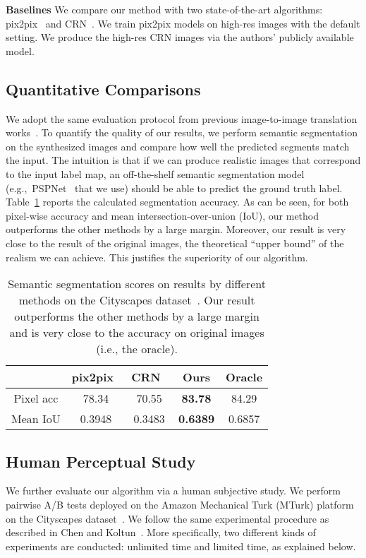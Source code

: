 \documentclass[10pt,twocolumn,letterpaper]{article}
\newcommand{\reftbl}[1]{Table~\ref{tbl:#1}}
\newcommand{\lblsec}[1]{\label{sec:#1}}
\newcommand{\lbltbl}[1]{\label{tbl:#1}}
\newcommand{\ck}{Chen and Koltun~\cite{chen2017photographic}\xspace}
\newcommand{\pp}{pix2pix\xspace}
\begin{document}
\vspace{.03in}
{\noindent \bf Baselines} We compare our method with two state-of-the-art algorithms: \pp~\cite{isola2016image} and CRN~\cite{chen2017photographic}. We train \pp models on high-res images with the default setting. 
We produce the high-res CRN images via the authors' publicly available model.

\subsection{Quantitative Comparisons} \lblsec{results:quan}

We adopt the same evaluation protocol from previous image-to-image translation works~\cite{isola2016image,zhu2017unpaired}.
To quantify the quality of our results, we perform semantic segmentation on the synthesized images and compare how well the predicted segments match the input. The intuition is that if we can produce realistic images that correspond to the input label map, an off-the-shelf semantic segmentation model (e.g.,\ PSPNet~\cite{zhao2017pspnet} that we use) should be able to predict the ground truth label. \reftbl{seg} reports 
the calculated segmentation accuracy.  
As can be seen, for both pixel-wise accuracy and mean intersection-over-union (IoU), our method outperforms the other methods by a large margin.
Moreover, our result is very close to the result of the original images, the theoretical ``upper bound'' of the realism we can achieve.
This justifies the superiority of our algorithm.

\begin{table}[t!]
\centering
\begin{tabular}{  c  c  c  c | c  }
\toprule
\multicolumn{1}{c}{}
 & \pp~\cite{isola2016image} & CRN~\cite{chen2017photographic} & Ours & Oracle \\ \midrule Pixel acc & 78.34 &  70.55  &  {\bf 83.78}  &  84.29 \\ Mean IoU & 0.3948  &  0.3483  &  {\bf 0.6389}  &  0.6857 \\ \bottomrule \end{tabular}
\caption{Semantic segmentation scores on results by different methods on the Cityscapes dataset~\cite{Cordts2016cityscapes}. Our result outperforms the other methods by a large margin and is very close to the accuracy on original images (i.e., the oracle).}
\lbltbl{seg}
\end{table}

\subsection{Human Perceptual Study} \lblsec{results:qual}
We further evaluate our algorithm via a human subjective study.
We perform pairwise A/B tests deployed on the Amazon Mechanical Turk (MTurk) platform on the Cityscapes dataset~\cite{Cordts2016cityscapes}.
We follow the same experimental procedure as described in \ck.
More specifically, two different kinds of experiments are conducted: unlimited time and limited time, as explained below.
\end{document}
